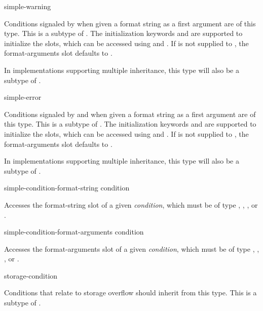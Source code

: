 \begin{defun}[Type]
simple-warning

  Conditions signaled by  when given a format string as a first
  argument are of this type. This is a subtype of .
  The initialization keywords  and  are supported
  to initialize the slots, which can be accessed using
   and .
  If  is not supplied to , the 
  format-arguments slot defaults to .

  In implementations supporting multiple inheritance, this type will also be
  a subtype of .
\end{defun}

\begin{defun}[Type]
simple-error

  Conditions signaled by  and  when given a format string 
  as a first argument are of this type. This is a subtype of .
  The initialization keywords  and  are supported
  to initialize the slots, which can be accessed using
   and .
  If  is not supplied to , the 
  format-arguments slot defaults to .

  In implementations supporting multiple inheritance, this type will also be
  a subtype of .
\end{defun}

\begin{defun}[Function]
simple-condition-format-string condition

  Accesses the format-string slot of a given \emph{condition}, which must be
  of type , , , or 
  .
\end{defun}

\begin{defun}[Function]
simple-condition-format-arguments condition

  Accesses the format-arguments slot of a given \emph{condition}, which must
  be of type , , , or
  .
\end{defun}


\begin{defun}[Type]
storage-condition

  Conditions that relate to storage overflow should inherit from this type.
  This is a subtype of .
\end{defun}


